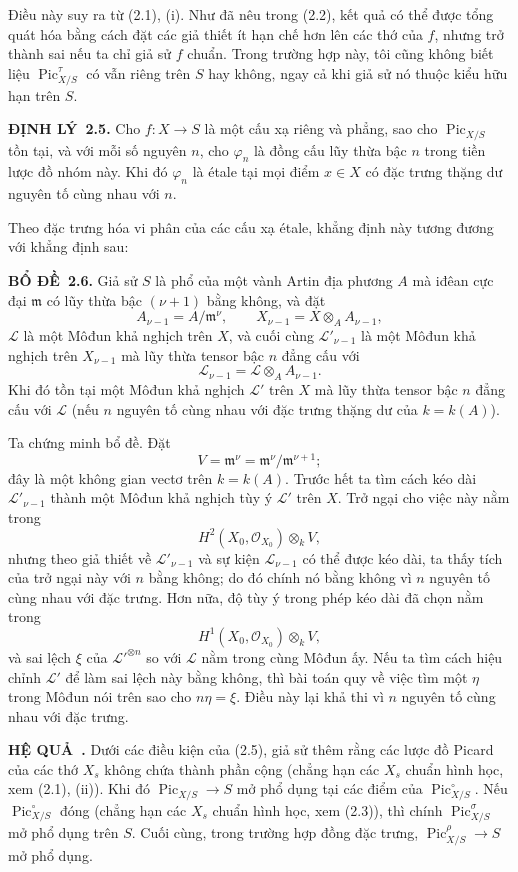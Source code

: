 \documentclass[11pt,twoside,openany]{book}
\numberwithin{equation}{section}
\newcommand{\src}[1]{%
  \phantomsection\hypertarget{src:\fgasourceid:#1}{}%
  \marginpar{\raggedleft\footnotesize\sffamily #1}%
}
\newcommand{\fgasourceid}{unset}
\newcommand{\result}[2]{\par\medskip\noindent\textbf{#1\if\relax\detokenize{#2}\relax\else\ #2\fi.}\quad}
\begin{document}
Điều này suy ra từ (2.1), (i). Như đã nêu trong (2.2), kết quả có thể được tổng
quát hóa bằng cách đặt các giả thiết ít hạn chế hơn lên các thớ của $f$, nhưng
trở thành sai nếu ta chỉ giả sử $f$ chuẩn. Trong trường hợp này, tôi cũng không
biết liệu $\operatorname{Pic}_{X/S}^\tau$ có vẫn riêng trên $S$ hay không,
ngay cả khi giả sử nó thuộc kiểu hữu hạn trên $S$.
\src{233}
\result{ĐỊNH LÝ}{2.5} Cho $f:X\longrightarrow S$ là một cấu xạ riêng và
phẳng, sao cho $\operatorname{Pic}_{X/S}$ tồn tại, và với mỗi số nguyên $n$,
cho $\varphi_n$ là đồng cấu lũy thừa bậc $n$ trong tiền lược đồ nhóm này. Khi
đó $\varphi_n$ là étale tại mọi điểm
$x\in X$ có đặc trưng
thặng dư nguyên tố cùng nhau với $n$.

Theo đặc trưng hóa vi phân của các cấu xạ étale, khẳng định này tương đương với
khẳng định sau:

\result{BỔ ĐỀ}{2.6} Giả sử $S$ là phổ của một vành Artin địa phương $A$ mà
iđêan cực đại $\mathfrak m$ có lũy thừa bậc $(\nu+1)$ bằng không, và đặt
\[
A_{\nu-1}=A/\mathfrak m^\nu,
\qquad X_{\nu-1}=X\otimes_A A_{\nu-1},
\]
$\mathcal L$ là một Môđun khả nghịch trên $X$, và cuối cùng
$\mathcal L'_{\nu-1}$ là một Môđun khả nghịch trên $X_{\nu-1}$ mà lũy thừa
tensor bậc $n$ đẳng cấu với
\[
\mathcal L_{\nu-1}=\mathcal L\otimes_A A_{\nu-1}.
\]
Khi đó tồn tại một Môđun khả nghịch $\mathcal L'$ trên $X$ mà lũy thừa tensor
bậc $n$ đẳng cấu với $\mathcal L$ (nếu $n$ nguyên tố cùng nhau với đặc trưng
thặng dư của $k=k(A)$).

Ta chứng minh bổ đề. Đặt
\[
V=\mathfrak m^\nu=\mathfrak m^\nu/\mathfrak m^{\nu+1} ;
\]
đây là một không gian vectơ trên $k=k(A)$. Trước hết ta tìm cách kéo dài
$\mathcal L'_{\nu-1}$ thành một Môđun khả nghịch tùy ý $\mathcal L'$ trên
$X$. Trở ngại cho việc này nằm trong
\[
H^2(X_0,\mathcal O_{X_0})\otimes_k V,
\]
nhưng theo giả thiết về $\mathcal L'_{\nu-1}$ và sự kiện
$\mathcal L_{\nu-1}$ có thể được kéo dài, ta thấy tích của trở ngại này với
$n$ bằng không; do đó chính nó bằng không vì $n$ nguyên tố cùng nhau với đặc
trưng. Hơn nữa, độ tùy ý trong phép kéo dài đã chọn nằm trong
\[
H^1(X_0,\mathcal O_{X_0})\otimes_k V,
\]
và sai lệch $\xi$ của $\mathcal L'^{\otimes n}$ so với $\mathcal L$ nằm trong
cùng Môđun ấy. Nếu ta tìm cách hiệu chỉnh $\mathcal L'$ để làm sai lệch này
bằng không, thì bài toán quy về việc tìm một $\eta$ trong Môđun nói trên sao
cho $n\eta=\xi$. Điều này lại khả thi vì $n$ nguyên tố cùng nhau với đặc
trưng.

\result{HỆ QUẢ}{} Dưới các điều kiện của (2.5), giả sử thêm rằng các lược đồ
Picard của các thớ $X_s$ không chứa thành phần cộng (chẳng hạn các $X_s$ chuẩn
hình học, xem (2.1), (ii)). Khi đó
$\operatorname{Pic}_{X/S}\longrightarrow S$ mở phổ dụng tại các điểm của
$\operatorname{Pic}_{X/S}^\circ$. Nếu $\operatorname{Pic}_{X/S}^\circ$ đóng
(chẳng hạn các $X_s$ chuẩn hình học, xem (2.3)), thì chính
$\operatorname{Pic}_{X/S}^\sigma$ mở phổ dụng trên $S$. Cuối cùng, trong
trường hợp đồng đặc trưng, $\operatorname{Pic}_{X/S}^\rho\longrightarrow S$
mở phổ dụng.
\end{document}
